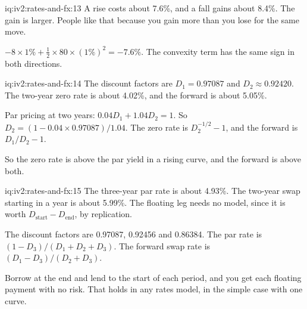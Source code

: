 \begin{solution}{iq:iv2:rates-and-fx:13}
A rise costs about 7.6\%, and a fall gains about 8.4\%. The gain is larger. People like that because you gain more than you lose for the same move.

$-8 \times 1\% + \tfrac12 \times 80 \times (1\%)^2 = -7.6\%$. The convexity term has the same sign in both directions.

\end{solution}

\begin{solution}{iq:iv2:rates-and-fx:14}
The discount factors are $D_1 = 0.97087$ and $D_2 \approx 0.92420$. The two-year zero rate is about 4.02\%, and the forward is about 5.05\%.

Par pricing at two years: $0.04D_1 + 1.04D_2 = 1$. So $D_2 = (1 - 0.04 \times 0.97087)/1.04$. The zero rate is $D_2^{-1/2} - 1$, and the forward is $D_1/D_2 - 1$.

So the zero rate is above the par yield in a rising curve, and the forward is above both.

\end{solution}

\begin{solution}{iq:iv2:rates-and-fx:15}
The three-year par rate is about 4.93\%. The two-year swap starting in a year is about 5.99\%. The floating leg needs no model, since it is worth $D_{\text{start}} - D_{\text{end}}$, by replication.

The discount factors are 0.97087, 0.92456 and 0.86384. The par rate is $(1 - D_3)/(D_1 + D_2 + D_3)$. The forward swap rate is $(D_1 - D_3)/(D_2 + D_3)$.

Borrow at the end and lend to the start of each period, and you get each floating payment with no risk. That holds in any rates model, in the simple case with one curve.

\end{solution}

